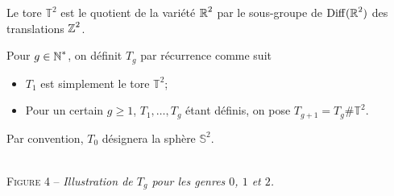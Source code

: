 Le tore $\mathbb T^2$ est le quotient de la variété $\operatorname{\mathbb R}^2$ par le sous-groupe de $\operatorname{Diff}(\operatorname{\mathbb R}^2)$ 
des translations $\operatorname{\mathbb Z}^2$.

\begin{defi}
    Pour $g\in\operatorname{\mathbb N}^*$, on définit $T_g$ par récurrence comme suit 
    \begin{itemize}
        \item $T_1$ est simplement le tore $\mathbb T^2$;
        \item Pour un certain $g\geq 1$, $T_1,\dots,T_g$ étant définis, on pose 
        $T_{g+1}=T_g\#\mathbb T^2$.
    \end{itemize}
    Par convention, $T_0$ désignera la sphère $\mathbb S^2$.
\end{defi}

\begin{center}
    \\
    \textsc{Figure 4} – \textit{Illustration de $T_g$ pour les genres $0$, $1$ et $2$.}
\end{center}
